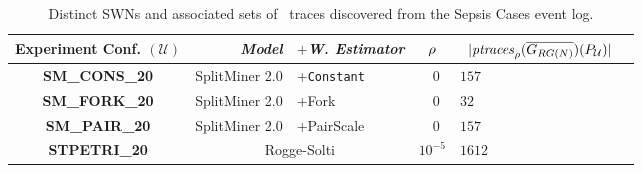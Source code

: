 \begin{table}[!t]
\caption{Distinct SWNs and associated sets of \unravelled\ traces discovered from the Sepsis Cases event log.}\label{tab:dataset}
\centering
 \begin{adjustbox}{width=.6\textwidth}
	\begin{tabular}{crl||cl|c}
		\toprule
		\textbf{Experiment Conf.} $(\mathcal{U})$ & \textit{Model} & $+$\textit{W. Estimator} & $\pmin$& $\;\;|\WCal{\pmin}{n}(P_{\mathcal{U}})|$ \\
		\midrule
		
		\textbf{SM\_CONS\_20} &SplitMiner 2.0  \cite{AugustoCDRP19}       & +\texttt{Constant} &  $\;\;0$ & $157$  \\
		
		\textbf{SM\_FORK\_20} & SplitMiner 2.0  \cite{AugustoCDRP19}      & +Fork \cite{spdwe} &  $\;\;0$ & $32$  \\
		
		
		\textbf{SM\_PAIR\_20} & SplitMiner 2.0  \cite{AugustoCDRP19}      & +PairScale \cite{spdwe} &  $\;\;0$ & $157$ \\

		\textbf{STPETRI\_20} & \multicolumn{2}{c||}{Rogge-Solti \cite{RoggeSoltiAW13}} &  $10^{-5}$ & $1612$ \\
		\bottomrule
	\end{tabular}
\end{adjustbox}
\end{table}



